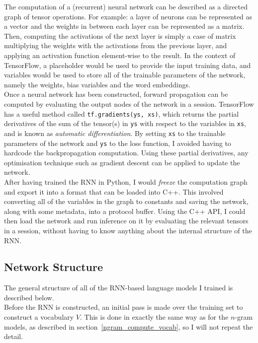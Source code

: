 \documentclass[a4paper, 12pt]{report}
\newcommand{\ttt}[1]{\texttt{#1}}
\newcommand{\tit}[1]{\textit{#1}}
\begin{document}
The computation of a (recurrent) neural network can be described as a directed graph of tensor operations. For example: a layer of neurons can be represented as a vector and the weights in between each layer can be represented as a matrix. Then, computing the activations of the next layer is simply a case of matrix multiplying the weights with the activations from the previous layer, and applying an activation function element-wise to the result. In the context of TensorFlow, a placeholder would be used to provide the input training data, and variables would be used to store all of the trainable parameters of the network, namely the weights, bias variables and the word embeddings. \\

Once a neural network has been constructed, forward propagation can be computed by evaluating the output nodes of the network in a session. TensorFlow has a useful method called \ttt{tf.gradients(ys, xs)}, which returns the partial derivatives of the sum of the tensor(s) in \ttt{ys} with respect to the variables in \ttt{xs}, and is known as \tit{automatic differentiation}. By setting \ttt{xs} to the trainable parameters of the network and \ttt{ys} to the loss function, I avoided having to hardcode the backpropagation computation. Using these partial derivatives, any optimisation technique such as gradient descent can be applied to update the network. \\

After having trained the RNN in Python, I would \tit{freeze} the computation graph and export it into a format that can be loaded into C++. This involved converting all of the variables in the graph to constants and saving the network, along with some metadata, into a protocol buffer. Using the C++ API, I could then load the network and run inference on it by evaluating the relevant tensors in a session, without having to know anything about the internal structure of the RNN.

\subsection{Network Structure} \label{rnn_structure}

The general structure of all of the RNN-based language models I trained is described below. \\

Before the RNN is constructed, an initial pass is made over the training set to construct a vocabulary $V$. This is done in exactly the same way as for the $n$-gram models, as described in section~\ref{ngram_compute_vocab}, so I will not repeat the detail. \\
\end{document}

